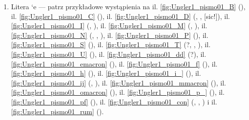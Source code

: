 \begin{enumerate}
\begin{enumerate}
  
  \item Litera `e --- patrz przykładowe wystąpienia na
il. \vref{fig:Ungler1_pismo01_B} (),
  il. \vref{fig:Ungler1_pismo01_C} (),
  il. \vref{fig:Ungler1_pismo01_D} (,
,
 [sic!]),
  il. \vref{fig:Ungler1_pismo01_I} (,
),
  il. \vref{fig:Ungler1_pismo01_M} (,
),
  il. \vref{fig:Ungler1_pismo01_N} (, , ),
  il. \vref{fig:Ungler1_pismo01_P} (),
  il. \vref{fig:Ungler1_pismo01_S} (),
  il. \vref{fig:Ungler1_pismo01_T} (?, , ),
  il. \vref{fig:Ungler1_pismo01_U} (),
 il. \vref{fig:Ungler1_pismo01_dd} (?),
  il. \vref{fig:Ungler1_pismo01_emacron} (),
  il. \vref{fig:Ungler1_pismo01_f} (),
  il. \vref{fig:Ungler1_pismo01_h} (),
il. \vref{fig:Ungler1_pismo01_i_} (),
il. \vref{fig:Ungler1_pismo01_ij} (, ),
    il. \vref{fig:Ungler1_pismo01_mmacron} (),
   il. \vref{fig:Ungler1_pismo01_omacron} (),
il. \vref{fig:Ungler1_pismo01_p_} (),
il. \vref{fig:Ungler1_pismo01_pf} (),
  il. \vref{fig:Ungler1_pismo01_con} (, , ) i
 il. \vref{fig:Ungler1_pismo01_rum} ().



\end{enumerate}
\end{enumerate}
